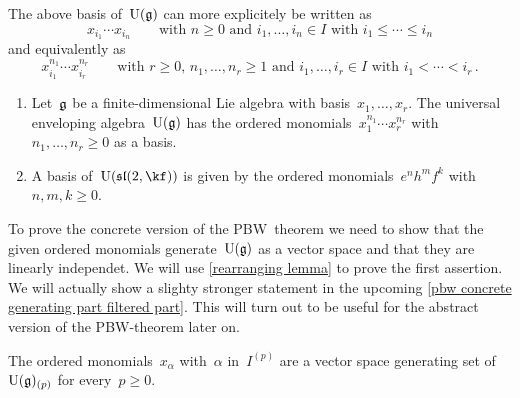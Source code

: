 \begin{remark}
	The above basis of~$\operatorname{U}(\mathfrak{g})$ can more explicitely be written as
	\[
		x_{i_1} \dotsm x_{i_n}
		\qquad
		\text{with~$n \geq 0$ and~$i_1, \dotsc, i_n \in I$ with~$i_1 \leq \dotsb \leq i_n$}
	\]
	and equivalently as
	\[
		x_{i_1}^{n_1} \dotsm x_{i_r}^{n_r}
		\qquad
		\text{with~$r \geq 0$,~$n_1, \dotsc, n_r \geq 1$ and~$i_1, \dotsc, i_r \in I$ with~$i_1 < \dotsb < i_r$} \,.
	\]
\end{remark}


\begin{example}
	\leavevmode
	\begin{enumerate}
		\item
			Let~$\mathfrak{g}$ be a finite-dimensional Lie algebra with basis~$x_1, \dotsc, x_r$.
			The universal enveloping algebra~$\operatorname{U}(\mathfrak{g})$ has the ordered monomials~$x_1^{n_1} \dotsm x_r^{n_r}$ with~$n_1, \dotsc, n_r \geq 0$ as a basis.
		\item
			A basis of~$\Univ(\sllie(2, \kf))$ is given by the ordered monomials~$e^n h^m f^k$ with~$n, m, k \geq 0$.
	\end{enumerate}
\end{example}


\begin{fluff}
	To prove the concrete version of the PBW~theorem we need to show that the given ordered monomials generate~$\operatorname{U}(\mathfrak{g})$ as a vector space and that they are linearly independet.
	We will use \cref{rearranging lemma} to prove the first assertion.
	We will actually show a slighty stronger statement in the upcoming \cref{pbw concrete generating part filtered part}.
	This will turn out to be useful for the abstract version of the PBW-theorem later on.
\end{fluff}


\begin{lemma}
	\label{pbw concrete generating part filtered part}
	The ordered monomials~$x_\alpha$ with~$\alpha$ in~$I^{(p)}$ are a vector space generating set of~$\operatorname{U}(\mathfrak{g})_{(p)}$ for every~$p \geq 0$.
\end{lemma}


